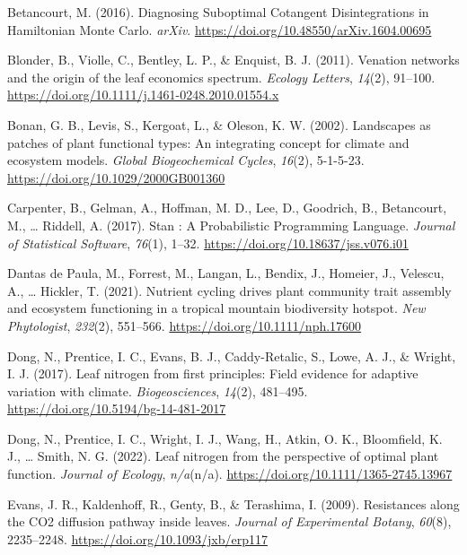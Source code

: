 \documentclass[
  12pt,
  letterpaper,
  DIV=11,
  numbers=noendperiod]{scrartcl}
\newlength{\cslhangindent}
\newlength{\cslentryspacingunit} %
\newenvironment{CSLReferences}[2] %
 {%
  \setlength{\parindent}{0pt}
  \ifodd #1
  \let\oldpar\par
  \def\par{\hangindent=\cslhangindent\oldpar}
  \fi
  \setlength{\parskip}{#2\cslentryspacingunit}
 }%
 {}
\begin{document}
\hypertarget{refs}{}
\begin{CSLReferences}{1}{0}
\leavevmode{}%
Betancourt, M. (2016). Diagnosing {Suboptimal Cotangent Disintegrations}
in {Hamiltonian Monte Carlo}. \emph{arXiv}.
\url{https://doi.org/10.48550/arXiv.1604.00695}

\leavevmode{}%
Blonder, B., Violle, C., Bentley, L. P., \& Enquist, B. J. (2011).
Venation networks and the origin of the leaf economics spectrum.
\emph{Ecology Letters}, \emph{14}(2), 91--100.
\url{https://doi.org/10.1111/j.1461-0248.2010.01554.x}

\leavevmode{}%
Bonan, G. B., Levis, S., Kergoat, L., \& Oleson, K. W. (2002).
Landscapes as patches of plant functional types: {An} integrating
concept for climate and ecosystem models. \emph{Global Biogeochemical
Cycles}, \emph{16}(2), 5-1-5-23.
\url{https://doi.org/10.1029/2000GB001360}

\leavevmode{}%
Carpenter, B., Gelman, A., Hoffman, M. D., Lee, D., Goodrich, B.,
Betancourt, M., \ldots{} Riddell, A. (2017). Stan : {A Probabilistic
Programming Language}. \emph{Journal of Statistical Software},
\emph{76}(1), 1--32. \url{https://doi.org/10.18637/jss.v076.i01}

\leavevmode{}%
Dantas de Paula, M., Forrest, M., Langan, L., Bendix, J., Homeier, J.,
Velescu, A., \ldots{} Hickler, T. (2021). Nutrient cycling drives plant
community trait assembly and ecosystem functioning in a tropical
mountain biodiversity hotspot. \emph{New Phytologist}, \emph{232}(2),
551--566. \url{https://doi.org/10.1111/nph.17600}

\leavevmode{}%
Dong, N., Prentice, I. C., Evans, B. J., Caddy-Retalic, S., Lowe, A. J.,
\& Wright, I. J. (2017). Leaf nitrogen from first principles: Field
evidence for adaptive variation with climate. \emph{Biogeosciences},
\emph{14}(2), 481--495. \url{https://doi.org/10.5194/bg-14-481-2017}

\leavevmode{}%
Dong, N., Prentice, I. C., Wright, I. J., Wang, H., Atkin, O. K.,
Bloomfield, K. J., \ldots{} Smith, N. G. (2022). Leaf nitrogen from the
perspective of optimal plant function. \emph{Journal of Ecology},
\emph{n/a}(n/a). \url{https://doi.org/10.1111/1365-2745.13967}

\leavevmode{}%
Evans, J. R., Kaldenhoff, R., Genty, B., \& Terashima, I. (2009).
Resistances along the {CO2} diffusion pathway inside leaves.
\emph{Journal of Experimental Botany}, \emph{60}(8), 2235--2248.
\url{https://doi.org/10.1093/jxb/erp117}


\end{CSLReferences}
\end{document}
